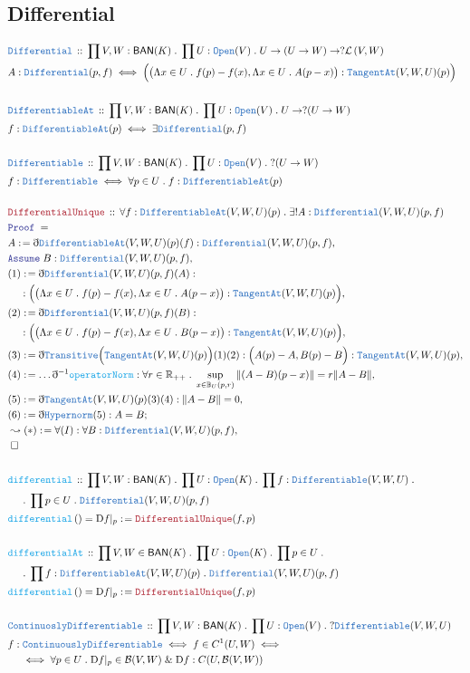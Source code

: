 \documentclass[12pt]{scrartcl}
\newcommand{\TYPE}[1]{\textcolor{NavyBlue}{\mathtt{#1}}}
\newcommand{\FUNC}[1]{\textcolor{Cerulean}{\mathtt{#1}}}
\newcommand{\LOGIC}[1]{\textcolor{Blue}{\mathtt{#1}}}
\newcommand{\THM}[1]{\textcolor{Maroon}{\mathtt{#1}}}
\renewcommand{\.}{\; . \;}
\newcommand{\de}{: \kern 0.1pc =}
\newcommand{\Act}[1]{\left( #1 \right)}
\newcommand{\Theorem}[2]{& \THM{#1} \, :: \, #2 \\ & \Proof = \\ }
\newcommand{\DeclareType}[2]{& \TYPE{#1} \, :: \, #2 \\}
\newcommand{\DefineType}[3]{& #1 : \TYPE{#2} \iff #3 \\}
\newcommand{\DefineNamedType}[4]{& #1 : \TYPE{#2} \iff #3 \iff #4 \\}
\newcommand{\DeclareFunc}[2]{& \FUNC{#1} \, :: \, #2 \\}
\newcommand{\DefineNamedFunc}[4]{&  \FUNC{#1}\Act{#2} = #3 \de #4 \\}
\newcommand{\NewLine}{\\ & \kern 1pc}
\newcommand{\Page}[1]{\begin{align*} #1 \end{align*}   }
\newcommand{ \bd }{ \ByDef }
\renewcommand{\And}{\; \& \;}
\newcommand{\Reals}{\mathbb{R} }
\newcommand{\Say}[3]{& #1 \de #2 : #3, \\}
\newcommand{\Conclude}[3]{& #1 \de #2 : #3; \\}
\newcommand{\Derive}[3]{& \leadsto #1 \de #2 : #3, \\}
\newcommand{\A}{\LOGIC{Assume} \;}
\newcommand{\Assume}[2]{& \A #1 : #2, \\}
\newcommand{\QED}{\; \square}
\newcommand{\EndProof}{& \QED \\}
\newcommand{\ByDef}{\eth}
\newcommand{\Proof}{\LOGIC{Proof} \; }
\newcommand{\Ball}{ \mathbb{B} }
\newcommand{\Lin}[1]{\mathcal{L}\left( #1 \right)}
\newcommand{\BAN}{\mathsf{BAN}} %
\newcommand{\D}{\mathrm{D}}
\newcommand{\B}{\mathcal{B}}
\begin{document}
\subsection{Differential}
\Page{
	\DeclareType{Differential}{ \prod V,W : \BAN(K) \. \prod U : \TYPE{Open}(V) \. U \to ( U \to W) \to ? \Lin{V,W} }
	& A : \TYPE{Differential}(p,f) \iff \Big( \big(\Lambda x \in U \. f(p) - f(x), \Lambda x \in U \. A(p - x) \big) : \TYPE{TangentAt}(V,W,U)(p)  \Big) \\
	\\
	\DeclareType{DifferentiableAt}{\prod V,W : \BAN(K) \. \prod U : \TYPE{Open}(V) \. U \to ?(U \to W)}
	& f : \TYPE{DifferentiableAt}(p) \iff \exists \TYPE{Differential}(p,f) \\
	\\
	\DeclareType{Differentiable}{\prod V,W : \BAN(K) \. \prod U : \TYPE{Open}(V) \. ?(U \to W)}
	\DefineType{f}{Differentiable}{ \forall p \in U \. f : \TYPE{DifferentiableAt}(p) }
	\\
	\Theorem{DifferentialUnique}{\forall f : \TYPE{DifferentiableAt}(V,W,U)(p) \. \exists ! A : \TYPE{Differential}(V,W,U)(p,f)}
	\Say{A}{\bd \TYPE{DifferentiableAt}(V,W,U)(p)(f)}{\TYPE{Differential}(V,W,U)(p,f)}
	\Assume{B}{\TYPE{Differential}(V,W,U)(p,f)}
	\Say{(1)}{\bd \TYPE{Differential}(V,W,U)(p,f)(A)}{  
	\NewLine :
	\Big( \big(\Lambda x \in U \. f(p) - f(x), \Lambda x \in U \. A(p - x) \big) : \TYPE{TangentAt}(V,W,U)(p) \Big) }
	\Say{(2)}{\bd \TYPE{Differential}(V,W,U)(p,f)(B)}{  
	\NewLine :
	\Big( \big(\Lambda x \in U \. f(p) - f(x), \Lambda x \in U \. B(p - x) \big) : \TYPE{TangentAt}(V,W,U)(p) \Big) }
	\Say{(3)}{ \bd \TYPE{Transitive} \Big( \TYPE{TangentAt}(V,W,U)(p) \Big)(1)(2) }{ \Big( A(p) - A, B(p) - B  \Big) : \TYPE{TangentAt}(V,W,U)(p)   }
	\Say{(4)}{ \ldots  \bd^{-1} \FUNC{operatorNorm}  }{\forall r \in \Reals_{++} \. \sup_{x \in \Ball_U(p,r)} \| (A - B)(p - x) \| = r \| A - B \|     }
	\Say{(5)}{\bd \TYPE{TangentAt}(V,W,U)(p)(3)(4)}{ \| A - B \| = 0    }
	\Conclude{(6)}{ \bd \TYPE{Hypernorm}(5)}{A = B}
	\Derive{(*)}{\forall(I)}{\forall B : \TYPE{Differential}(V,W,U)(p,f)}
	\EndProof
	\\
	\DeclareFunc{differential}{ \prod V,W : \BAN(K) \. \prod U : \TYPE{Open}(K) \. \prod f :  \TYPE{Differentiable}(V,W,U) \.
	\NewLine \.
	\prod p \in U \. \TYPE{Differential}(V,W,U)(p,f)}
	\DefineNamedFunc{differential}{}{\D f |_p}{\THM{DifferentialUnique}(f,p)}
	\\
	\DeclareFunc{differentialAt}{ \prod V,W \in \BAN(K) \. \prod U : \TYPE{Open}(K) \. \prod p  \in U \.
	\NewLine \.
	\prod f : \TYPE{DifferentiableAt}(V,W,U)(p)  \. \TYPE{Differential}(V,W,U)(p,f)}
	\DefineNamedFunc{differential}{}{\D f |_p}{\THM{DifferentialUnique}(f,p)}
	\\
	\DeclareType{ContinuoslyDifferentiable}{\prod V,W : \BAN(K) \. \prod U : \TYPE{Open}(V) \. ? \TYPE{Differentiable}(V,W,U)}
	\DefineNamedType{f}{ContinuouslyDifferentiable}{ f \in C^1(U,W) }{  
	\NewLine \iff
	\forall p \in U \. \D f |_p \in \B(V,W) \And \D f : C(U,\B(V,W)) }
}
\end{document}
